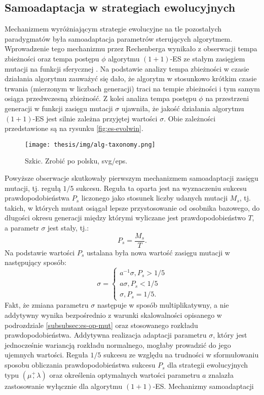 \subsection{Samoadaptacja w strategiach ewolucyjnych}
\label{subsubsec:es-autoadapt}
    Mechanizmem wyróżniającym strategie ewolucyjne na tle pozostałych paradygmatów była samoadaptacja parametrów sterujących algorytmem. Wprowadzenie tego mechanizmu przez Rechenberga wynikało z obserwacji tempa zbieżności oraz tempa postępu $\phi$ algorytmu $(1+1)$-ES ze stałym zasięgiem mutacji na funkcji sferycznej \source. Na podstawie analizy tempa zbieżności w czasie działania algorytmu zauważyć się dało, że algorytm w stosunkowo krótkim czasie trwania (mierzonym w liczbach generacji) traci na tempie zbieżności i tym samym osiąga przedwczesną zbieżność. Z kolei analiza tempa postępu $\phi$ na przestrzeni generacji w funkcji zasięgu mutacji $\sigma$ ujawniła, że jakość działania algorytmu $(1+1)$-ES jest silnie zależna przyjętej wartości $\sigma$. Obie zależności przedstawione są na rysunku \ref{fig:es-evolwin}. 
    \begin{figure}[h]
        \centering
        \texttt{[image: thesis/img/alg-taxonomy.png]}
        \caption{Szkic. Zrobić po polsku, svg/eps.}
        \label{fig:poziomice}
    \end{figure}
    Powyższe obserwacje skutkowały pierwszym mechanizmem samoadaptacji zasięgu mutacji, tj. regułą $1/5$ sukcesu. Reguła ta oparta jest na wyznaczeniu sukcesu prawdopodobieństwa $P_{s}$ liczonego jako stosunek liczby udanych mutacji $M_{s}$, tj. takich, w których mutant osiągał lepsze przystosowanie od osobnika bazowego, do długości okresu generacji między którymi wyliczane jest prawdopodobieństwo $T$, a parametr $\sigma$ jest stały, tj.:
    \begin{equation}
        P_{s} = \frac{M_{s}}{T}.
    \end{equation}
    Na podstawie wartości $P_{s}$ ustalana była nowa wartość zasięgu mutacji w następujący sposób:
    \begin{equation*}
        \sigma = 
            \begin{cases}
                a^{-1}\sigma, P_s > 1/5 \\
                a\sigma, P_s < 1/5 \\
                \sigma, P_s = 1/5.
            \end{cases}
    \end{equation*}
    Fakt, że zmiana parametru $\sigma$ następuje w sposób multiplikatywny, a nie addytywny wynika bezpośrednio z warunki skalowalności opisanego w podrozdziale \ref{subsubsec:es-op-mut} oraz stosowanego rozkładu prawdopodobieństwa. Addytywna realizacja adaptacji parametru $\sigma$, który jest jednocześnie wariancją rozkładu normalnego, mogłaby prowadzić do jego ujemnych wartości. Reguła $1/5$ sukcesu ze względu na trudności w sformułowaniu sposobu obliczania prawdopodobieństwa sukcesu $P_{s}$ dla strategii ewolucyjnych typu $(\mu\overset{+}{,}\lambda)$ oraz określenia optymalnych wartości parametru $a$ znalazła zastosowanie wyłącznie dla algorytmu $(1+1)$-ES. Mechanizmy samoadaptacji
